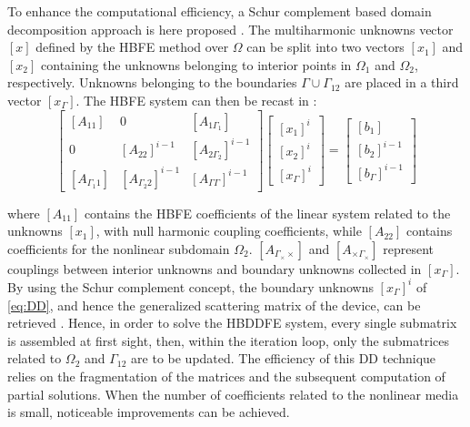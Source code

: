 To enhance the computational efficiency, a Schur complement based domain decomposition approach is here proposed \cite{Guarnieri2010,Guarnieri2009}. The multiharmonic unknowns vector $[x]$ defined by the HBFE method over $\Omega$ can be split into two vectors $[x_{1}]$ and $[x_{2}]$ containing the unknowns belonging
to interior points in $\Omega_1$ and $\Omega_2$, respectively. Unknowns
belonging to the boundaries $\Gamma\cup\Gamma_{12}$ are placed in a third
vector $[x_{\Gamma}]$. The HBFE system can then be recast in :
%
\begin{equation}\label{eq:DD}
\begin{bmatrix}
 [A_{11}] &  0  &  [A_{1\Gamma_1}] \\
 0  &  [A_{22}]^{i-1} & [A_{2 \Gamma_2}]^{i-1} \\
 [A_{\Gamma_1 1}] & [A_{\Gamma_2 2}]^{i-1} & [A_{\Gamma \Gamma}]^{i-1}
\end{bmatrix}
\begin{bmatrix}
{[x_{1}]^{i}} \\
{[x_{2}]^{i}} \\
{[x_{\Gamma}]^{i}}
\end{bmatrix} 
=
\begin{bmatrix}
{[b_{1}]} \\
{[b_{2}]}^{i-1} \\
{[b_{\Gamma}]}^{i-1}
\end{bmatrix} 
\end{equation}

\noindent where $[A_{11}]$ contains the HBFE coefficients of the linear system
related to the unknowns $[x_{1}]$, with
null harmonic coupling coefficients, while $[A_{22}]$ contains coefficients for
the nonlinear subdomain $\Omega_2$. ${[A_{\Gamma_\times \times}]}$ and ${[A_{ \times \Gamma_\times}]}$
represent couplings between interior unknowns and 
boundary unknowns collected in $[x_\Gamma]$. 
By using the Schur complement concept, the boundary unknowns $[x_\Gamma]^{i}$ of
\eqref{eq:DD}, and hence the generalized scattering matrix of the device, can be retrieved \cite{Guarnieri2010, Guarnieri2009}.
Hence, in order to solve the HBDDFE system,
every single submatrix is assembled at first sight, then, within the iteration
loop, only the submatrices related to $\Omega_2$ and $\Gamma_{12}$ are to be
updated. The efficiency of this 
DD technique relies on the fragmentation of the
matrices and the subsequent computation of partial solutions. When the number
of coefficients related to the nonlinear media is small, noticeable
improvements can be achieved.

